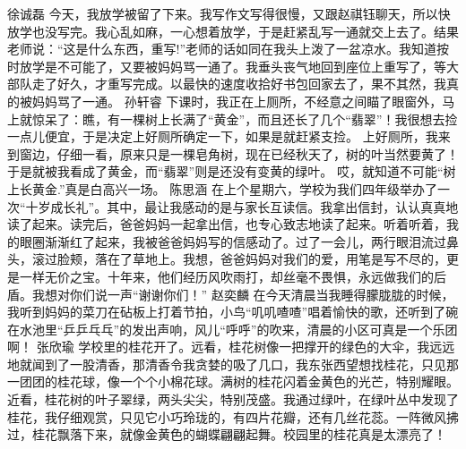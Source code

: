 {}\markdownRendererInterblockSeparator
{}徐诚磊\markdownRendererInterblockSeparator
{}今天，我放学被留了下来。我写作文写得很慢，又跟赵祺钰聊天，所以快放学也没写完。我心乱如麻，一心想着放学，于是赶紧乱写一通就交上去了。结果老师说：“这是什么东西，重写!”老师的话如同在我头上泼了一盆凉水。我知道按时放学是不可能了，又要被妈妈骂一通了。我垂头丧气地回到座位上重写了，等大部队走了好久，才重写完成。以最快的速度收拾好书包回家去了，果不其然，我真的被妈妈骂了一通。\markdownRendererInterblockSeparator
{}\markdownRendererInterblockSeparator
{}孙轩睿\markdownRendererInterblockSeparator
{}下课时，我正在上厕所，不经意之间瞄了眼窗外，马上就惊呆了：瞧，有一棵树上长满了“黄金”，而且还长了几个“翡翠”！我很想去捡一点儿便宜，于是决定上好厕所确定一下，如果是就赶紧支捡。 上好厕所，我来到窗边，仔细一看，原来只是一棵皂角树，现在已经秋天了，树的叶当然要黄了！于是就被我看成了黄金，而“翡翠”则是还没有变黄的绿叶。 哎，就知道不可能“树上长黄金.”真是白高兴一场。\markdownRendererInterblockSeparator
{}\markdownRendererInterblockSeparator
{}陈思涵\markdownRendererInterblockSeparator
{}在上个星期六，学校为我们四年级举办了一次“十岁成长礼”。其中，最让我感动的是与家长互读信。我拿出信封，认认真真地读了起来。读完后，爸爸妈妈一起拿出信，也专心致志地读了起来。听着听着，我的眼圈渐渐红了起来，我被爸爸妈妈写的信感动了。过了一会儿，两行眼泪流过鼻头，滚过脸颊，落在了草地上。我想，爸爸妈妈对我们的爱，用笔是写不尽的，更是一样无价之宝。十年来，他们经历风吹雨打，却丝毫不畏惧，永远做我们的后盾。我想对你们说一声“谢谢你们！”\markdownRendererInterblockSeparator
{}\markdownRendererInterblockSeparator
{}赵奕麟\markdownRendererInterblockSeparator
{}在今天清晨当我睡得朦胧胧的时候，我听到妈妈的菜刀在砧板上打着节拍，小鸟“叽叽喳喳”唱着愉快的歌，还听到了碗在水池里“乒乒乓乓”的发出声响，风儿“呼呼”的吹来，清晨的小区可真是一个乐团啊！\markdownRendererInterblockSeparator
{}\markdownRendererInterblockSeparator
{}张欣瑜\markdownRendererInterblockSeparator
{}学校里的桂花开了。远看，桂花树像一把撑开的绿色的大伞，我远远地就闻到了一股清香，那清香令我贪婪的吸了几口，我东张西望想找桂花，只见那一团团的桂花球，像一个个小棉花球。满树的桂花闪着金黄色的光芒，特别耀眼。近看，桂花树的叶子翠绿，两头尖尖，特别茂盛。我通过绿叶，在绿叶丛中发现了桂花，我仔细观赏，只见它小巧玲珑的，有四片花瓣，还有几丝花蕊。一阵微风拂过，桂花飘落下来，就像金黄色的蝴蝶翩翩起舞。校园里的桂花真是太漂亮了！\markdownRendererInterblockSeparator
